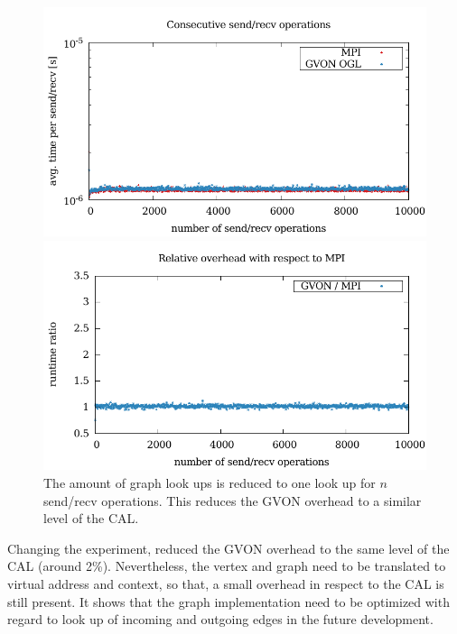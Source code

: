 \begin{figure}[H]
  \begin{minipage}[t]{0.5\textwidth} 
    \includegraphics[width=\textwidth]{plots/50_nsend_one_lookup_laser}
  \end{minipage}%
  \begin{minipage}[t]{0.5\textwidth}
    \includegraphics[width=\textwidth]{plots/50_nsend_one_lookup_overhead_gvon_laser}
  \end{minipage}%
  \caption{The amount of graph look ups is reduced to one look up for
    $n$ send/recv operations.  This reduces the GVON overhead to
    a similar level of the CAL.}
  \label{fig:nsend_one_lookup_kepler}
\end{figure}

\noindent Changing the experiment, reduced the GVON overhead to the
same level of the CAL (around 2\%). Nevertheless, the vertex and
graph need to be translated to virtual address and context, so that, a
small overhead in respect to the CAL is still present. It shows that
the graph implementation need to be optimized with regard to look up
of incoming and outgoing edges in the future development.

